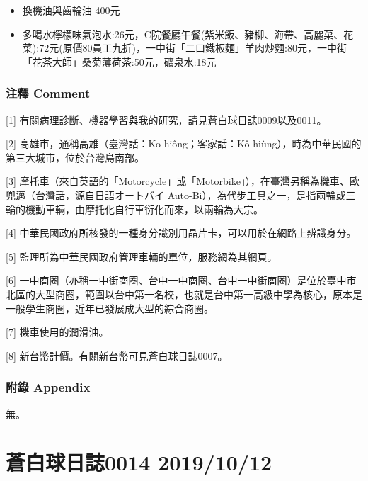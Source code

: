 \documentclass[a5paper, 12pt
]{book}
\providecommand{\tightlist}{%
  \setlength{\itemsep}{0pt}\setlength{\parskip}{0pt}}
\begin{document}
\begin{enumerate}
  \begin{itemize}
  \tightlist
  \item
    換機油與齒輪油 400元
  \item
    多喝水檸檬味氣泡水:26元，C院餐廳午餐(紫米飯、豬柳、海帶、高麗菜、花菜):72元(原價80員工九折)，一中街「二口鐵板麵」羊肉炒麵:80元，一中街「花茶大師」桑菊薄荷茶:50元，礦泉水:18元
  \end{itemize}
\end{enumerate}

\hypertarget{ux6ce8ux91cb-comment-6}{%
\subsubsection{注釋 Comment}\label{ux6ce8ux91cb-comment-6}}

{[}1{]} 有關病理診斷、機器學習與我的研究，請見蒼白球日誌0009以及0011。

{[}2{]}
高雄市，通稱高雄（臺灣話：Ko-hiông；客家話：Kô-hiùng），時為中華民國的第三大城市，位於台灣島南部。

{[}3{]}
摩托車（來自英語的「Motorcycle」或「Motorbike」），在臺灣另稱為機車、歐兜邁（台灣話，源自日語オートバイ
Auto-Bi），為代步工具之一，是指兩輪或三輪的機動車輛，由摩托化自行車衍化而來，以兩輪為大宗。

{[}4{]}
中華民國政府所核發的一種身分識別用晶片卡，可以用於在網路上辨識身分。

{[}5{]} 監理所為中華民國政府管理車輛的單位，服務網為其網頁。

{[}6{]}
一中商圈（亦稱一中街商圈、台中一中商圈、台中一中街商圈）是位於臺中市北區的大型商圈，範圍以台中第一名校，也就是台中第一高級中學為核心，原本是一般學生商圈，近年已發展成大型的綜合商圈。

{[}7{]} 機車使用的潤滑油。

{[}8{]} 新台幣計價。有關新台幣可見蒼白球日誌0007。

\hypertarget{ux9644ux9304-appendix-5}{%
\subsubsection{附錄 Appendix}\label{ux9644ux9304-appendix-5}}

無。

\hypertarget{ux84bcux767dux7403ux65e5ux8a8c0014-20191012}{%
\section{蒼白球日誌0014
2019/10/12}\label{ux84bcux767dux7403ux65e5ux8a8c0014-20191012}}
\end{document}
